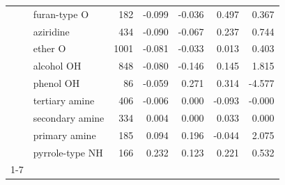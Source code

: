 \begin{table}
\begin{tabular}{llrrrrr}
 & furan-type O & 182 & -0.099 & -0.036 & 0.497 & 0.367 \\
 & aziridine & 434 & -0.090 & -0.067 & 0.237 & 0.744 \\
 & ether O & 1001 & -0.081 & -0.033 & 0.013 & 0.403 \\
 & alcohol OH & 848 & -0.080 & -0.146 & 0.145 & 1.815 \\
 & phenol OH & 86 & -0.059 & 0.271 & 0.314 & -4.577 \\
 & tertiary amine & 406 & -0.006 & 0.000 & -0.093 & -0.000 \\
 & secondary amine & 334 & 0.004 & 0.000 & 0.033 & 0.000 \\
 & primary amine & 185 & 0.094 & 0.196 & -0.044 & 2.075 \\
 & pyrrole-type NH & 166 & 0.232 & 0.123 & 0.221 & 0.532 \\
\cline{1-7}
\bottomrule
\end{tabular}
\end{table}
